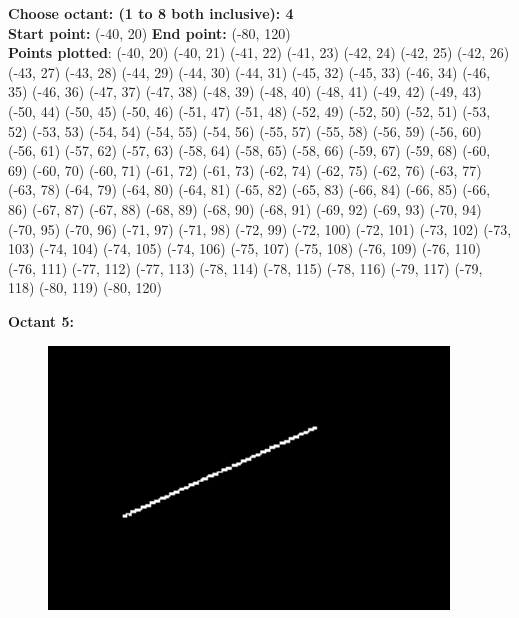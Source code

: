 \documentclass[12pt,letterpaper]{article}
\begin{document}
\textbf{Choose octant: (1 to 8 both inclusive): 4}\\
\textbf{Start point:} (-40, 20)
\textbf{End point:} (-80, 120)\\
\textbf{Points plotted}:
(-40, 20) (-40, 21) (-41, 22) (-41, 23) 
(-42, 24) (-42, 25) (-42, 26) (-43, 27) 
(-43, 28) (-44, 29) (-44, 30) (-44, 31) 
(-45, 32) (-45, 33) (-46, 34) (-46, 35) 
(-46, 36) (-47, 37) (-47, 38) (-48, 39) 
(-48, 40) (-48, 41) (-49, 42) (-49, 43) 
(-50, 44) (-50, 45) (-50, 46) (-51, 47) 
(-51, 48) (-52, 49) (-52, 50) (-52, 51) 
(-53, 52) (-53, 53) (-54, 54) (-54, 55) 
(-54, 56) (-55, 57) (-55, 58) (-56, 59) 
(-56, 60) (-56, 61) (-57, 62) (-57, 63) 
(-58, 64) (-58, 65) (-58, 66) (-59, 67) 
(-59, 68) (-60, 69) (-60, 70) (-60, 71) 
(-61, 72) (-61, 73) (-62, 74) (-62, 75) 
(-62, 76) (-63, 77) (-63, 78) (-64, 79) 
(-64, 80) (-64, 81) (-65, 82) (-65, 83) 
(-66, 84) (-66, 85) (-66, 86) (-67, 87) 
(-67, 88) (-68, 89) (-68, 90) (-68, 91) 
(-69, 92) (-69, 93) (-70, 94) (-70, 95) 
(-70, 96) (-71, 97) (-71, 98) (-72, 99) 
(-72, 100) (-72, 101) (-73, 102) (-73, 103) 
(-74, 104) (-74, 105) (-74, 106) (-75, 107) 
(-75, 108) (-76, 109) (-76, 110) (-76, 111) 
(-77, 112) (-77, 113) (-78, 114) (-78, 115) 
(-78, 116) (-79, 117) (-79, 118) (-80, 119) 
(-80, 120)


\newpage
\textbf{Octant 5:}
\begin{figure}[h]
    \centering
    \includegraphics[height=7cm]{Outputs/O5.png}
\end{figure}
\end{document}
